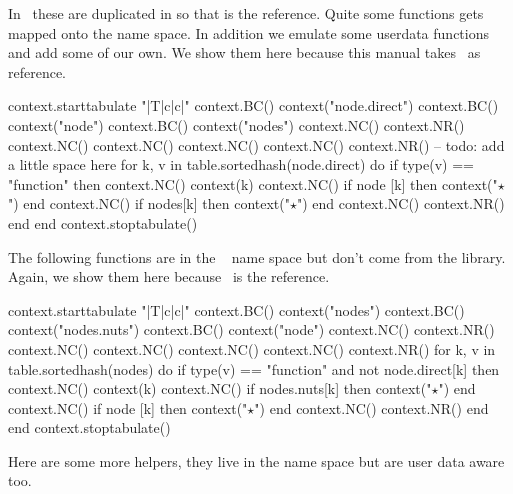 In \CONTEXT\ these are duplicated in  so that is the reference.
Quite some functions gets mapped onto the  name space. In addition we
emulate some userdata functions and add some of our own. We show them here because
this manual takes \CONTEXT\ as reference.

\starttworows
\startluacode
    context.starttabulate { "|T|c|c|" }
        context.BC() context("node.direct")
        context.BC() context("node")
        context.BC() context("nodes")
        context.NC() context.NR()
        context.NC()
        context.NC()
        context.NC()
        context.NC() context.NR()
        -- todo: add a little space here
        for k, v in table.sortedhash(node.direct) do
            if type(v) == "function" then
                context.NC() context(k)
                context.NC() if node [k] then context("$⋆$") end
                context.NC() if nodes[k] then context("$⋆$") end
                context.NC() context.NR()
            end
        end
    context.stoptabulate()
\stopluacode
\stoptworows

The following functions are in the \CONTEXT\  name space but don't
come from the library. Again, we show them here because \CONTEXT\ is the
reference.

\starttworows
\startluacode
    context.starttabulate { "|T|c|c|" }
        context.BC() context("nodes")
        context.BC() context("nodes.nuts")
        context.BC() context("node")
        context.NC() context.NR()
        context.NC()
        context.NC()
        context.NC()
        context.NC() context.NR()
        for k, v in table.sortedhash(nodes) do
            if type(v) == "function" and not node.direct[k] then
                context.NC() context(k)
                context.NC() if nodes.nuts[k] then context("$⋆$") end
                context.NC() if node      [k] then context("$⋆$") end
                context.NC() context.NR()
            end
        end
    context.stoptabulate()
\stopluacode
\stoptworows



Here are some more helpers, they live in the  name space but are
user data aware too.

